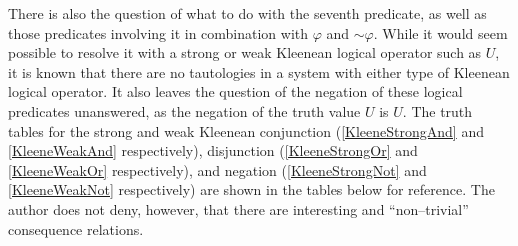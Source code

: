 \documentclass[12pt]{article}
\renewcommand{\phi}{\varphi}
\newcommand{\lognot}{\ensuremath{\sim \!}}
\begin{document}
There is also the question of what to do with the seventh predicate, as well as those predicates involving it in combination with $\phi$ and $\lognot \phi$.
While it would seem possible to resolve it with a strong or weak Kleenean logical operator such as $U$, it is known that there are no tautologies in
a system with either type of Kleenean logical operator. \cite{Burns2023} It also leaves the question of the negation of these logical predicates unanswered, as the negation of the truth value $U$ is
$U$. The truth tables for the strong and weak Kleenean conjunction (\ref{KleeneStrongAnd} and \ref{KleeneWeakAnd} respectively), disjunction (\ref{KleeneStrongOr} and \ref{KleeneWeakOr} respectively), 
and negation (\ref{KleeneStrongNot} and \ref{KleeneWeakNot} respectively) are shown in the tables below for reference. The author does not deny, however,
that there are interesting and ``non--trivial'' \cite{Burns2023} consequence relations.
\end{document}
